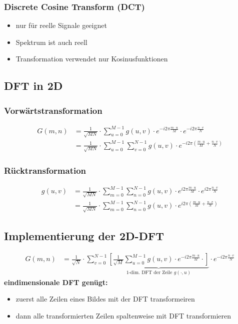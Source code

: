 \documentclass[10pt]{article}
\begin{document}
\subsubsection*{Discrete Cosine Transform (DCT)}
\begin{itemize}
	\item nur für reelle Signale geeignet
	\item Spektrum ist auch reell
	\item Transformation verwendet nur Kosinusfunktionen
\end{itemize}

\subsection{DFT in 2D}
\subsubsection*{Vorwärtstransformation}
\begin{align*}
	G(m,n) &= \frac{1}{\sqrt{MN}} \cdot \sum_{u=0}^{M-1}  g(u,v) \cdot e^{-i2\pi\frac{m \cdot u}{M}} \cdot e^{-i2\pi\frac{n \cdot v}{N}} \\
	&= \frac{1}{\sqrt{MN}} \cdot \sum_{u=0}^{M-1} \sum_{v=0}^{N-1} g(u,v) \cdot e^{-i2\pi \left( \frac{m \cdot u}{M} + \frac{n \cdot v}{N}\right)} 
\end{align*}
\subsubsection*{Rücktransformation}
\begin{align*}
	g(u,v) &= \frac{1}{\sqrt{MN}} \cdot \sum_{m=0}^{M-1} \sum_{n=0}^{N-1} g(u,v) \cdot e^{i2\pi\frac{m \cdot u}{M}} \cdot e^{i2\pi\frac{n \cdot v}{N}} \\
	&= \frac{1}{\sqrt{MN}} \cdot \sum_{m=0}^{M-1} \sum_{n=0}^{N-1} g(u,v) \cdot e^{i2\pi \left( \frac{m \cdot u}{M} + \frac{n \cdot v}{N}\right)} 
\end{align*}

\subsection{Implementierung der 2D-DFT}
\begin{align*}
	G(m,n) &= \frac{1}{\sqrt{N}} \cdot \sum_{v=0}^{N-1} \underbrace{\left[ \frac{1}{\sqrt{M}} \sum_{u=0}^{M-1} g(u,v) \cdot e^{-i2\pi\frac{m \cdot u}{M}} \cdot  \right]}_{\text{1-dim. DFT der Zeile }g(\cdot,u)} \cdot e^{-i2\pi\frac{n \cdot v}{N}} 
\end{align*}
\textbf{eindimensionale DFT genügt:}
\begin{itemize}
	\item zuerst alle Zeilen eines Bildes mit der DFT transformeiren
	\item dann alle transformierten Zeilen spaltenweise mit DFT transformieren
\end{itemize}
\end{document}
